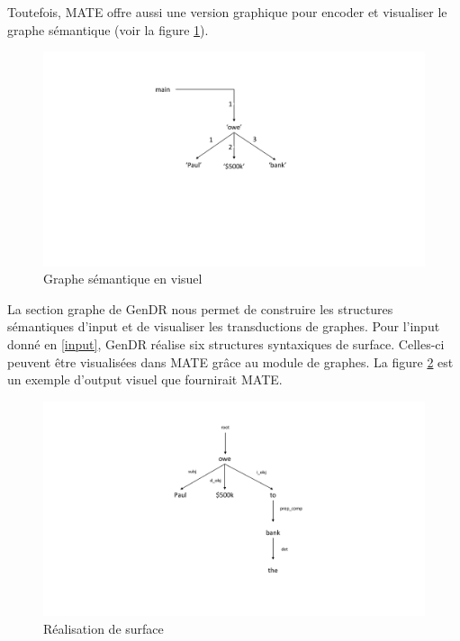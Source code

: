 Toutefois, MATE offre aussi une version graphique pour encoder et visualiser le graphe sémantique (voir la figure \ref{fig:graphesem}).

\begin{figure}[htb]
	\centering
	\includegraphics[width=1\textwidth, trim = {0cm 7cm 0cm 3cm},clip]{ch3/figs/owe_sem.pdf}
	\caption{Graphe sémantique en visuel}
	\label{fig:graphesem}
\end{figure}


La section graphe de GenDR nous permet de construire les structures sémantiques d'input et de visualiser les transductions de graphes. Pour l'input donné en \ref{input}, GenDR réalise six structures syntaxiques de surface. Celles-ci peuvent être visualisées dans MATE grâce au module de graphes. La figure \ref{fig:realsurfex} est un exemple d'output visuel que fournirait MATE. 

\begin{figure}[htb]
	\centering
	\includegraphics[width=1\textwidth, trim = {0cm 3cm 0cm 2cm},clip]{ch3/figs/realsurfex.pdf}
	\caption{Réalisation de surface}
	\label{fig:realsurfex}
\end{figure}

